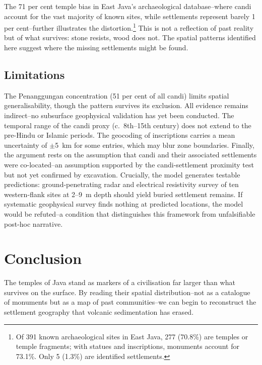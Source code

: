 \documentclass[12pt,a4paper]{article}
\begin{document}
The 71 per cent temple bias in East Java's archaeological database--where candi account for the vast majority of known sites, while settlements represent barely 1 per cent--further illustrates the distortion.\footnote{Of 391 known archaeological sites in East Java, 277 (70.8\%) are temples or temple fragments; with statues and inscriptions, monuments account for 73.1\%. Only 5 (1.3\%) are identified settlements.}
This is not a reflection of past reality but of what survives: stone resists, wood does not.
The spatial patterns identified here suggest where the missing settlements might be found.

\subsection{Limitations}

The Penanggungan concentration (51 per cent of all candi) limits spatial generalisability, though the pattern survives its exclusion.
All evidence remains indirect--no subsurface geophysical validation has yet been conducted.
The temporal range of the candi proxy (c.~8th--15th century) does not extend to the pre-Hindu or Islamic periods.
The geocoding of inscriptions carries a mean uncertainty of $\pm$5~km for some entries, which may blur zone boundaries.
Finally, the argument rests on the assumption that candi and their associated settlements were co-located--an assumption supported by the candi-settlement proximity test but not yet confirmed by excavation.
Crucially, the model generates testable predictions: ground-penetrating radar and electrical resistivity survey of ten western-flank sites at 2--9~m depth should yield buried settlement remains.
If systematic geophysical survey finds nothing at predicted locations, the model would be refuted--a condition that distinguishes this framework from unfalsifiable post-hoc narrative.


\section{Conclusion}

The temples of Java stand as markers of a civilisation far larger than what survives on the surface.
By reading their spatial distribution--not as a catalogue of monuments but as a map of past communities--we can begin to reconstruct the settlement geography that volcanic sedimentation has erased.
\end{document}
